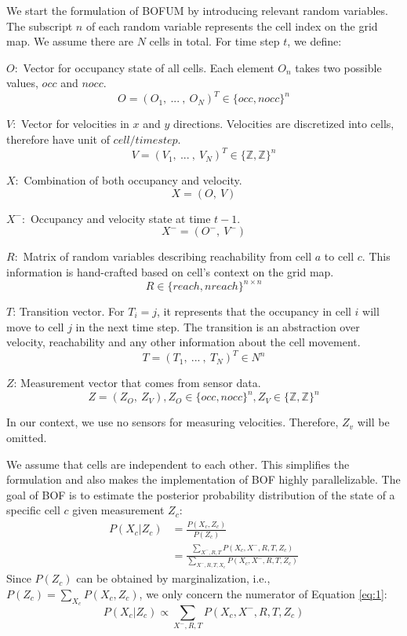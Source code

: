 We start the formulation of BOFUM by introducing relevant random variables. The subscript $n$ of each random variable represents the cell index on the grid map. We assume there are $N$ cells in total. For time step $t$, we define:

\begin{my_enumerate}
\item[] $O:$ Vector for occupancy state of all cells. Each element $O_n$ takes two possible values, $occ$ and $nocc$.
\[ O = (O_1, \ ... \ , \ O_N)^T \in \{ occ, nocc\}^n \]

\item[] $V:$ Vector for velocities in $x$ and $y$ directions. Velocities are discretized into cells, therefore have unit of $cell/timestep$.
\[ V = (V_1, \ ... \ , \ V_N)^T \in \{ \mathbb{Z}, \mathbb{Z}\}^n \]

\item[] $X:$ Combination of both occupancy and velocity. 
\[ X = (O, \ V) \]

\item[] $X^-:$ Occupancy and velocity state at time $t-1$.
\[ X^- = (O^-, \ V^-) \]

\item[] $R:$ Matrix of random variables describing reachability from cell $a$ to cell $c$. This information is hand-crafted based on cell's context on the grid map. 
\[ R \in \{reach, nreach\}^{n \times n}\]

\item[] $T$: Transition vector. For $T_i = j$, it represents that the occupancy in cell $i$ will move to cell $j$ in the next time step. The transition is an abstraction over velocity, reachability and any other information about the cell movement. 
\[ T = (T_1, \ ... \ , \ T_N)^T \in N^n\]

\item[] $Z$: Measurement vector that comes from sensor data.
\[Z = (Z_O, \ Z_V), Z_O \in  \{ occ, nocc\}^n , Z_V \in \{ \mathbb{Z}, \mathbb{Z}\}^n\]

In our context, we use no sensors for measuring velocities. Therefore, $Z_v$ will be omitted.
\end{my_enumerate}

We assume that cells are independent to each other. This simplifies the formulation and also makes the implementation of BOF highly parallelizable. The goal of BOF is to estimate the posterior probability distribution of the state of a specific cell $c$ given measurement $Z_c$:
\begin{align}
P(X_c|Z_c) &= \frac{P(X_c, Z_c)}{P(Z_c)} \label{eq:1} \\ 
         &= \frac{\sum_{X^-, R, T}{P(X_c, X^-, R, T, Z_c)}}{\sum_{X^-, R, T, X_c}{P(X_c, X^-, R, T, Z_c)}} 
\end{align}
Since $P(Z_c)$ can be obtained by marginalization, i.e., $P(Z_c)= \sum_{X_c}{P(X_c, Z_c)}$, we only concern the numerator of Equation \ref{eq:1}:
\begin{equation}
P(X_c|Z_c) \propto \sum_{X^-, R, T}{P(X_c, X^-, R, T, Z_c)} \label{eq:4}
\end{equation}

